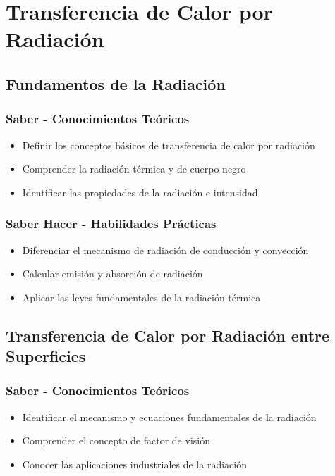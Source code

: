 \documentclass[12pt,a4paper,twoside]{book}
\begin{document}
	\chapter{Transferencia de Calor por Radiación}
	\label{chap:radiacion}
	
	\section{Fundamentos de la Radiación}
	\label{sec:fundamentos_radiacion}
	
	\subsection{Saber - Conocimientos Teóricos}
	\begin{saberbox}
		\begin{itemize}
			\item Definir los conceptos básicos de transferencia de calor por radiación
			\item Comprender la radiación térmica y de cuerpo negro
			\item Identificar las propiedades de la radiación e intensidad
		\end{itemize}
	\end{saberbox}
	
	\subsection{Saber Hacer - Habilidades Prácticas}
	\begin{hacerbox}
		\begin{itemize}
			\item Diferenciar el mecanismo de radiación de conducción y convección
			\item Calcular emisión y absorción de radiación
			\item Aplicar las leyes fundamentales de la radiación térmica
		\end{itemize}
	\end{hacerbox}
	
	\section{Transferencia de Calor por Radiación entre Superficies}
	\label{sec:radiacion_superficies}
	
	\subsection{Saber - Conocimientos Teóricos}
	\begin{saberbox}
		\begin{itemize}
			\item Identificar el mecanismo y ecuaciones fundamentales de la radiación
			\item Comprender el concepto de factor de visión
			\item Conocer las aplicaciones industriales de la radiación
		\end{itemize}
	\end{saberbox}
	
\end{document}
